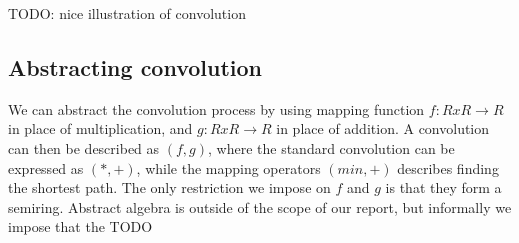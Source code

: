 TODO: nice illustration of convolution

\subsection{Abstracting convolution}
We can abstract the convolution process by using mapping function $f: R x R \rightarrow R$ in place of multiplication, and $g: R x R \rightarrow R$ in place of addition.
A convolution can then be described as $(f, g)$, where the standard convolution can be expressed as $(*, +)$, while the mapping operators $(min, +)$ describes finding the shortest path.
The only restriction we impose on $f$ and $g$ is that they form a semiring.
Abstract algebra is outside of the scope of our report, but informally we impose that the TODO 


